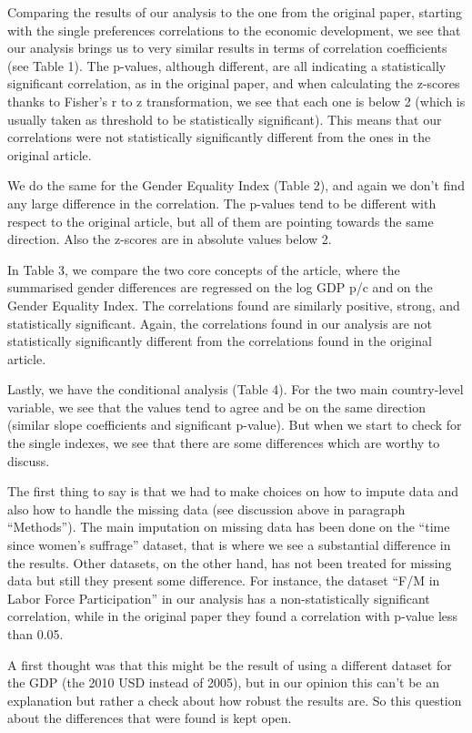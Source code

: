 \documentclass[
  11pt,
]{article}
\begin{document}
Comparing the results of our analysis to the one from the original
paper, starting with the single preferences correlations to the economic
development, we see that our analysis brings us to very similar results
in terms of correlation coefficients (see Table 1). The p-values,
although different, are all indicating a statistically significant
correlation, as in the original paper, and when calculating the z-scores
thanks to Fisher's r to z transformation, we see that each one is below
2 (which is usually taken as threshold to be statistically significant).
This means that our correlations were not statistically significantly
different from the ones in the original article.

We do the same for the Gender Equality Index (Table 2), and again we
don't find any large difference in the correlation. The p-values tend to
be different with respect to the original article, but all of them are
pointing towards the same direction. Also the z-scores are in absolute
values below 2.

In Table 3, we compare the two core concepts of the article, where the
summarised gender differences are regressed on the log GDP p/c and on
the Gender Equality Index. The correlations found are similarly
positive, strong, and statistically significant. Again, the correlations
found in our analysis are not statistically significantly different from
the correlations found in the original article.

Lastly, we have the conditional analysis (Table 4). For the two main
country-level variable, we see that the values tend to agree and be on
the same direction (similar slope coefficients and significant p-value).
But when we start to check for the single indexes, we see that there are
some differences which are worthy to discuss.

The first thing to say is that we had to make choices on how to impute
data and also how to handle the missing data (see discussion above in
paragraph ``Methods''). The main imputation on missing data has been
done on the ``time since women's suffrage'' dataset, that is where we
see a substantial difference in the results. Other datasets, on the
other hand, has not been treated for missing data but still they present
some difference. For instance, the dataset ``F/M in Labor Force
Participation'' in our analysis has a non-statistically significant
correlation, while in the original paper they found a correlation with
p-value less than 0.05.

A first thought was that this might be the result of using a different
dataset for the GDP (the 2010 USD instead of 2005), but in our opinion
this can't be an explanation but rather a check about how robust the
results are. So this question about the differences that were found is
kept open.
\end{document}
